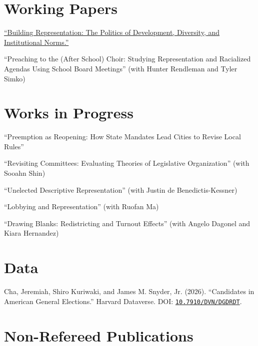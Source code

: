 \documentclass[11pt, letterpaper]{article}
\begin{document}
\section{Working Papers}

\begin{etaremune}
    \item \href{https://osf.io/preprints/socarxiv/a934k_v6}{``Building Representation: The Politics of Development, Diversity, and Institutional Norms.''}
    \item ``Preaching to the (After School) Choir: Studying Representation and Racialized Agendas Using School Board Meetings'' (with Hunter Rendleman and Tyler Simko)
\end{etaremune}

\section{Works in Progress}

\begin{etaremune}
    \item ``Preemption as Reopening: How State Mandates Lead Cities to Revise Local Rules''
    \item ``Revisiting Committees: Evaluating Theories of Legislative Organization'' (with Sooahn Shin)
    \item ``Unelected Descriptive Representation'' (with Justin de Benedictis-Kessner)
    \item ``Lobbying and Representation'' (with Ruofan Ma)
    \item ``Drawing Blanks: Redistricting and Turnout Effects'' (with Angelo Dagonel and Kiara Hernandez)
\end{etaremune}

\section{Data}

\begin{etaremune}
    \item Cha, Jeremiah, Shiro Kuriwaki, and James M. Snyder, Jr. (2026). ``Candidates in American General Elections.'' Harvard Dataverse. DOI: \href{https://doi.org/10.7910/DVN/DGDRDT}{\texttt{10.7910/DVN/DGDRDT}}.
\end{etaremune}

\section{Non-Refereed Publications}
\end{document}
